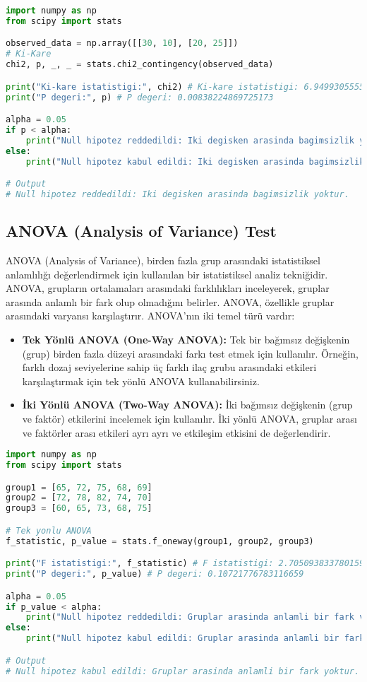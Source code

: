 \begin{lstlisting}[language=Python]
import numpy as np
from scipy import stats

observed_data = np.array([[30, 10], [20, 25]])
# Ki-Kare
chi2, p, _, _ = stats.chi2_contingency(observed_data)

print("Ki-kare istatistigi:", chi2) # Ki-kare istatistigi: 6.949930555555551
print("P degeri:", p) # P degeri: 0.00838224869725173

alpha = 0.05
if p < alpha:
    print("Null hipotez reddedildi: Iki degisken arasinda bagimsizlik yoktur.")
else:
    print("Null hipotez kabul edildi: Iki degisken arasinda bagimsizlik vardir.")

# Output
# Null hipotez reddedildi: Iki degisken arasinda bagimsizlik yoktur.
\end{lstlisting}

\subsection{ANOVA (Analysis of Variance) Test}
ANOVA (Analysis of Variance), birden fazla grup arasındaki istatistiksel anlamlılığı değerlendirmek için kullanılan bir istatistiksel analiz tekniğidir. ANOVA, grupların ortalamaları arasındaki farklılıkları inceleyerek, gruplar arasında anlamlı bir fark olup olmadığını belirler. ANOVA, özellikle gruplar arasındaki varyansı karşılaştırır. ANOVA'nın iki temel türü vardır:

\begin{itemize}
    \item \textbf{Tek Yönlü ANOVA (One-Way ANOVA):} Tek bir bağımsız değişkenin (grup) birden fazla düzeyi arasındaki farkı test etmek için kullanılır. Örneğin, farklı dozaj seviyelerine sahip üç farklı ilaç grubu arasındaki etkileri karşılaştırmak için tek yönlü ANOVA kullanabilirsiniz.
    \item \textbf{İki Yönlü ANOVA (Two-Way ANOVA):} İki bağımsız değişkenin (grup ve faktör) etkilerini incelemek için kullanılır. İki yönlü ANOVA, gruplar arası ve faktörler arası etkileri ayrı ayrı ve etkileşim etkisini de değerlendirir.
\end{itemize}

\begin{lstlisting}[language=Python]
import numpy as np
from scipy import stats

group1 = [65, 72, 75, 68, 69]
group2 = [72, 78, 82, 74, 70]
group3 = [60, 65, 73, 68, 75]

# Tek yonlu ANOVA 
f_statistic, p_value = stats.f_oneway(group1, group2, group3)

print("F istatistigi:", f_statistic) # F istatistigi: 2.7050938337801593
print("P degeri:", p_value) # P degeri: 0.10721776783116659

alpha = 0.05
if p_value < alpha:
    print("Null hipotez reddedildi: Gruplar arasinda anlamli bir fark vardir.")
else:
    print("Null hipotez kabul edildi: Gruplar arasinda anlamli bir fark yoktur.")

# Output
# Null hipotez kabul edildi: Gruplar arasinda anlamli bir fark yoktur.
\end{lstlisting}

